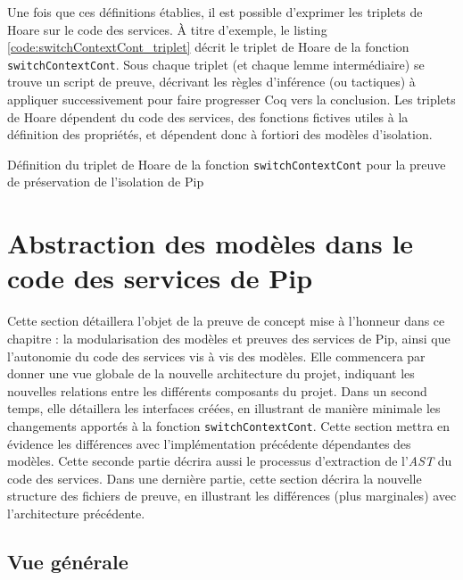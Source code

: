 			Une fois que ces définitions établies, il est possible d'exprimer les triplets de Hoare sur le code des services. À titre d'exemple, le listing \ref{code:switchContextCont_triplet} décrit le triplet de Hoare de la fonction \texttt{switchContextCont}. Sous chaque triplet (et chaque lemme intermédiaire) se trouve un script de preuve, décrivant les règles d'inférence (ou tactiques) à appliquer successivement pour faire progresser Coq vers la conclusion. Les triplets de Hoare dépendent du code des services, des fonctions fictives utiles à la définition des propriétés, et dépendent donc à fortiori des modèles d'isolation.
			\begin{listing}[!ht]
				\caption{Définition du triplet de Hoare de la fonction \texttt{switchContextCont} pour la preuve de préservation de l'isolation de Pip}
				\label{code:switchContextCont_triplet}
			\end{listing}

		
	\section{Abstraction des modèles dans le code des services de Pip}

	Cette section détaillera l'objet de la preuve de concept mise à l'honneur dans ce chapitre : la modularisation des modèles et preuves des services de Pip, ainsi que l'autonomie du code des services vis à vis des modèles. Elle commencera par donner une vue globale de la nouvelle architecture du projet, indiquant les nouvelles relations entre les différents composants du projet. Dans un second temps, elle détaillera les interfaces créées, en illustrant de manière minimale les changements apportés à la fonction \texttt{switchContextCont}. Cette section mettra en évidence les différences avec l'implémentation précédente dépendantes des modèles. Cette seconde partie décrira aussi le processus d'extraction de l'\emph{AST} du code des services. Dans une dernière partie, cette section décrira la nouvelle structure des fichiers de preuve, en illustrant les différences (plus marginales) avec l'architecture précédente.
		
		\subsection{Vue générale}

